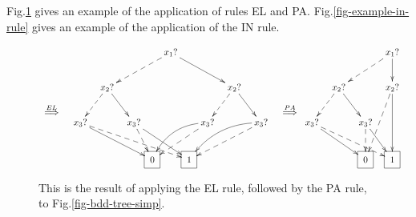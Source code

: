 Fig.\ref{fig-el-pa-example}
gives an example
of the application of rules EL and PA.
Fig.\ref{fig-example-in-rule}
gives an example of the
application of the IN rule.


\begin{figure}[h!]
$$
\xymatrix{
\\\\
\stackrel{EL}{\implies}}
\xymatrix@C=.1pc{
&&&&&&&x_1?\ar@{-->}[dllll]
\ar[drrrr]
\\
&&&x_2?\ar@{-->}[dll]\ar[drr]
&&&&&&&&x_2?\ar@{-->}[dll]\ar[drr]
\\
&x_3?\ar@{-->}[drrrrrrr]\ar[drrrrr]
&&&&x_3?\ar@{-->}[dr]\ar[drrr]
&&&&x_3?\ar@{-->}[dlll]\ar@/_1pc/[dlll]
&&&&x_3?\ar@{-->}[dlllll]\ar@/_1pc/[dlllll]
\\
&&
&&
&&\Rect{0}
&&\Rect{1}
&&
&&
&&
}
\xymatrix{
\\\\\stackrel{PA}{\implies}}
\xymatrix@C=.1pc{
&&&&&&x_1?\ar@{-->}[dllll]
\ar[d]
\\
&&x_2?\ar@{-->}[dll]\ar[drr]
&&&&x_2?\ar@{-->}[ddll]\ar[dd]
\\
x_3?\ar@{-->}[drrrrrr]\ar[drrrr]
&&&&x_3?\ar@{-->}[d]\ar[drr]
\\
&&
&&\Rect{0}
&&\Rect{1}
&&
&&
&&
}
$$
\caption{This is the
result of applying the
EL rule, followed by the PA
rule, to Fig.\ref{fig-bdd-tree-simp}.}
\label{fig-el-pa-example}
\end{figure}

